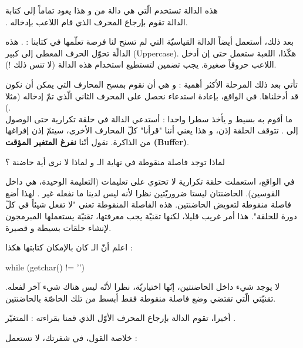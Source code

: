 هذه الدالة تستخدم
الّتي هي دالة من
و هذا يعود تماماً إلى كتابة\\
.
الدالة
تقوم بإرجاع المحرف الذي قام اللاعب بإدخاله.

بعد ذلك، أستعمل أيضاً الدالة القياسيّة التي لم تسنح لنا فرصة تعلّمها في كتابنا :
.
هذه الدالّة تحوّل الحرف المعطى إلى كبير
(\textenglish{Uppercase}).
هكّذا، اللعبة ستعمل حتى إن أدخل اللاعب حروفاً صغيرة. يجب تضمين
لتستطيع استخدام هذه الدالة (لا تنس ذلك !).

تأتي بعد ذلك المرحلة الأكثر أهمية : و هي أن نقوم بمسح المحارف التي يمكن أن نكون قد أدخلناها. في الواقع، بإعادة استدعاء
نحصل على المحرف الثاني الّذي تمّ إدخاله (مثلا
).\\
ما أقوم به بسيط و يأخذ سطرا واحدا : أستدعي الدالة
في حلقة تكرارية حتى الوصول إلى
.
تتوقف الحلقة إذن، و هذا يعني أننا "قرأنا" كلّ المحارف الأخرى، سيتمّ إذن إفراغها من الذاكرة. نقول أنّنا
\textbf{نفرغ المتغير المؤقت
(\textenglish{Buffer})}.

\begin{question}
لماذا توجد فاصلة منقوطة في نهاية الـ
و لماذا لا نرى أية حاضنة ؟
\end{question}

في الواقع، استعملت حلقة تكرارية لا تحتوي على تعليمات (التعليمة الوحيدة، هي
داخل القوسين). الحاضنتان ليستا ضروريّتين نظرا لأنه ليس لدينا ما نفعله غير
.
لهذا أضع فاصلة منقوطة لتعويض الحاضنتين. هذه الفاصلة المنقوطة تعني "لا تفعل شيئاً في كلّ دورة للحلقة". هذا أمر غريب قليلا، لكنها تقنيّة يجب معرفتها، تقنيّة يستعملها المبرمجون لإنشاء حلقات بسيطة و قصيرة.

اعلم أنّ الـ
كان بالإمكان كتابتها هكذا :

\begin{Csource}
while (getchar() != '\n')
{

}
\end{Csource}

لا يوجد شيء داخل الحاضنتين، إنّها اختياريّة، نظرا لأنّه ليس هناك شيء آخر لفعله. تقنيّتي الّتي تقتضي وضع فاصلة منقوطة فقط أبسط من تلك الخاصّة بالحاضنتين.

أخيرا، تقوم الدالة
بإرجاع المحرف الأوّل الذي قمنا بقراءته : المتغيّر
.

خلاصة القول، في شفرتك، لا تستعمل :

